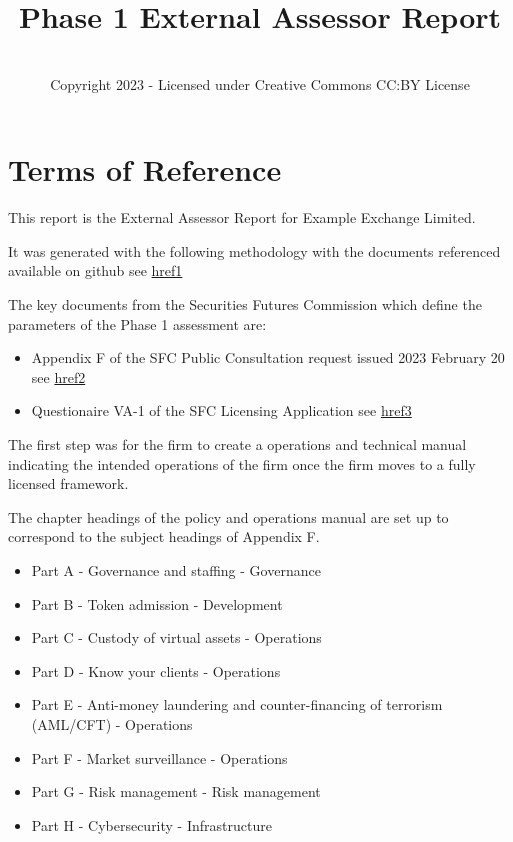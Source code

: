 \documentclass[]{report}
\title{Phase 1 External Assessor Report}
\author{\firmfullname\\Copyright 2023 - Licensed under Creative
  Commons CC:BY License}
\def\firmfullname{Example Exchange Limited}
\begin{document}
\maketitle
\section{Terms of Reference}

This report is the External Assessor Report for \firmfullname.  

It was generated with the following methodology with the documents
referenced available on github see \href{https://github.com/joequant/bitquant\-vasp}{href1}

The key documents from the Securities Futures Commission which define
the parameters of the Phase 1 assessment are:

\begin{itemize}
  \item Appendix F of the SFC Public Consultation request issued
    2023 February 20 see
    \href{https://github.com/joequant/bitquant-vasp/blob/main/regulations/sfc\-consultation\-20230220.pdf}{href2}
  \item Questionaire VA-1 of the SFC Licensing Application see
    \href{https://github.com/joequant/bitquant-vasp/blob/main/regulations/Questionnaire\-VA\-1.txt}{href3}
\end{itemize}

The first step was for the firm to create a operations and technical
manual indicating the intended operations of the firm once the firm
moves to a fully licensed framework.

The chapter headings of the policy and operations manual are set up to
correspond to the subject headings of Appendix F.

\begin{itemize}
\item Part A - Governance and staffing - Governance
\item Part B - Token admission - Development
\item Part C - Custody of virtual assets - Operations
\item Part D - Know your clients - Operations
\item Part E - Anti-money laundering and counter-financing of
  terrorism (AML/CFT) - Operations
\item Part F - Market surveillance - Operations
\item Part G - Risk management - Risk management
\item Part H - Cybersecurity - Infrastructure
\end{itemize}
\end{document}
